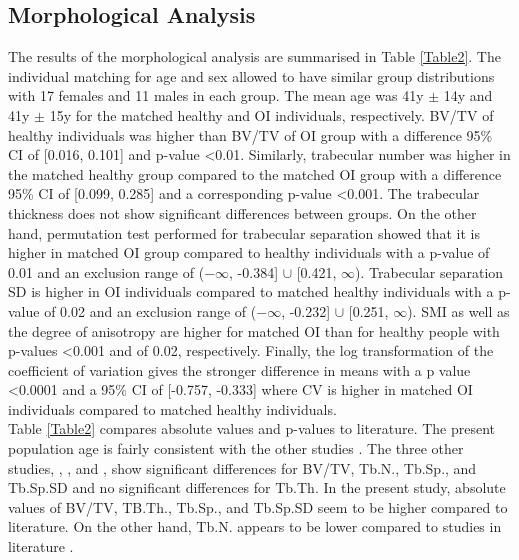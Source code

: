 \documentclass[a4paper,fleqn]{DC_ArtStyle}
\begin{document}
\subsection{Morphological Analysis}
The results of the morphological analysis are summarised in Table \ref{Table2}. The individual matching for age and sex allowed to have similar group distributions with 17 females and 11 males in each group. The mean age was 41y $\pm$ 14y and 41y $\pm$ 15y for the mat\-ched healthy and OI individuals, respectively. BV/TV of healthy individuals was higher than BV/TV of OI group with a difference 95\% CI of [0.016, 0.101] and p-value <0.01. Similarly, trabecular number was higher in the matched healthy group compared to the matched OI group with a difference 95\% CI of [0.099, 0.285] and a corresponding p-value <0.001. The trabecular thickness does not show significant differences between groups. On the other hand, permutation test performed for trabecular separation showed that it is higher in matched OI group compared to healthy individuals with a p-value of 0.01 and an exclusion range of ($-\infty$, -0.384] $\cup$ [0.421, $\infty$). Trabecular separation SD is higher in OI individuals compared to matched healthy individuals with a p-value of 0.02 and an exclusion range of ($-\infty$, -0.232] $\cup$ [0.251, $\infty$). SMI as well as the degree of anisotropy are higher for matched OI than for healthy people with p-values <0.001 and of 0.02, respectively. Finally, the log transformation of the coefficient of variation gives the stronger difference in means with a p value <0.0001 and a 95\% CI of [-0.757, -0.333] where CV is higher in matched OI individuals compared to matched healthy individuals.\\

Table \ref{Table2} compares absolute values and p-values to literature. The present population age is fairly consistent with the other studies \cite{Folkestad2012,Kocijan2015,Rolvien2018}. The three other studies,  \citeauthor{Folkestad2012}\cite{Folkestad2012}, \citeauthor{Kocijan2015}\cite{Kocijan2015}, and \citeauthor{Rolvien2018}\cite{Rolvien2018}, show significant differences for BV/TV, Tb.N., Tb.Sp., and Tb.Sp.SD and no significant differences for Tb.Th. In the present study, absolute values of BV/TV, TB.Th., Tb.Sp., and Tb.Sp.SD seem to be higher compared to literature. On the other hand, Tb.N. appears to be lower compared to studies in literature \cite{Folkestad2012,Kocijan2015,Rolvien2018}.
\end{document}
